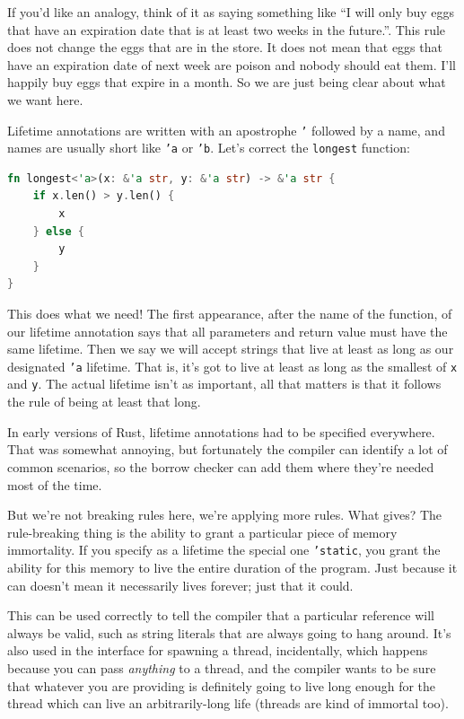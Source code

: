 \documentclass[a4paper]{report}
\begin{document}
If you'd like an analogy, think of it as saying something like ``I will only buy eggs that have an expiration date that is at least two weeks in the future.''. This rule does not change the eggs that are in the store. It does not mean that eggs that have an expiration date of next week are poison and nobody should eat them. I'll happily buy eggs that expire in a month. So we are just being clear about what we want here.

Lifetime annotations are written with an apostrophe \texttt{'} followed by a name, and names are usually short like \texttt{'a} or \texttt{'b}. Let's correct the \texttt{longest} function:

\begin{lstlisting}[language=Rust]
fn longest<'a>(x: &'a str, y: &'a str) -> &'a str {
    if x.len() > y.len() {
        x
    } else {
        y
    }
}
\end{lstlisting}

This does what we need! The first appearance, after the name of the function, of our lifetime annotation says that all parameters and return value must have the same lifetime. Then we say we will accept strings that live at least as long as our designated \texttt{'a} lifetime. That is, it's got to live at least as long as the smallest of \texttt{x} and \texttt{y}. The actual lifetime isn't as important, all that matters is that it follows the rule of being at least that long.

In early versions of Rust, lifetime annotations had to be specified everywhere. That was somewhat annoying, but fortunately the compiler can identify a lot of common scenarios, so the borrow checker can add them where they're needed most of the time.


But we're not breaking rules here, we're applying more rules. What gives? The rule-breaking thing is the ability to grant a particular piece of memory immortality. If you specify as a lifetime the special one \texttt{'static}, you grant the ability for this memory to live the entire duration of the program. Just because it can doesn't mean it necessarily lives forever; just that it could. 

This can be used correctly to tell the compiler that a particular reference will always be valid, such as string literals that are always going to hang around. It's also used in the interface for spawning a thread, incidentally, which happens because you can pass \textit{anything} to a thread, and the compiler wants to be sure that whatever you are providing is definitely going to live long enough for the thread which can live an arbitrarily-long life (threads are kind of immortal too). 
\end{document}
